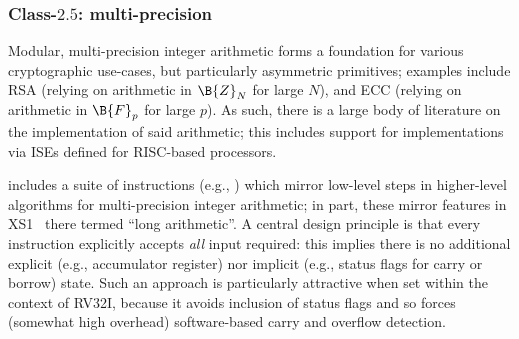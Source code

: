 
\subsubsection{Class-$2.5$: multi-precision}
\label{sec:bg:feature:2:5}

Modular, multi-precision integer arithmetic forms a foundation for various
cryptographic use-cases, but particularly asymmetric primitives; examples 
include
RSA (relying on arithmetic in $\B{Z}_N$ for large $N$),
and
ECC (relying on arithmetic in $\B{F}_p$ for large $p$).
As such, there is a large body of literature on the implementation of said 
arithmetic; this includes support for implementations via ISEs defined for 
RISC-based processors.

\XCID includes a suite of instructions 
(e.g., )
which mirror low-level steps in higher-level algorithms for multi-precision 
integer arithmetic; in part, these mirror features in 
XS1~\cite[Section 18]{SCARV:XS1:09} 
there termed ``long arithmetic''.  A central design principle is that every
instruction explicitly accepts {\em all} input required: this implies there
is no additional
explicit (e.g., accumulator register) 
nor 
implicit (e.g., status flags for carry or borrow)
state.
Such an approach is particularly attractive when set within the context of 
RV32I, because it avoids inclusion of status flags and so forces (somewhat 
high overhead) software-based carry and overflow detection.

